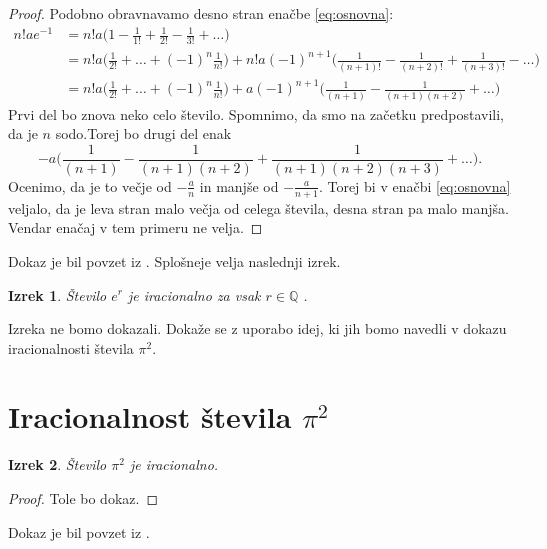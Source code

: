 \documentclass[a4paper]{article}
\theoremstyle{plain}
\newtheorem{izrek}{Izrek}
\begin{document}
\begin{proof}
Podobno obravnavamo desno stran enačbe \eqref{eq:osnovna}:
\begin{align*}
n!ae^{-1} &= n!a \bigg(1-\frac{1}{1!}+\frac{1}{2!}-\frac{1}{3!}+\dots \bigg) \\
&=n!a \bigg(\frac{1}{2!}+\dots+(-1)^n\frac{1}{n!}\bigg) + n!a (-1)^{n+1} \bigg( \frac{1}{(n+1)!}-\frac{1}{(n+2)!}+\frac{1}{(n+3)!}-\dots\bigg)\\
&=n!a \bigg(\frac{1}{2!}+\dots+(-1)^n\frac{1}{n!}\bigg) + a(-1)^{n+1} \bigg( \frac{1}{(n+1)}-\frac{1}{(n+1)(n+2)}+\dots\bigg)
\end{align*}
Prvi del bo znova neko celo število. Spomnimo, da smo na začetku predpostavili, da je $n$ sodo.Torej bo drugi del enak
\begin{equation*}
-a \bigg( \frac{1}{(n+1)}-\frac{1}{(n+1)(n+2)}+\frac{1}{(n+1)(n+2)(n+3)}+\dots\bigg).
\end{equation*}
Ocenimo, da je to večje od $-\frac{a}{n}$ in manjše od $-\frac{a}{n+1}$. Torej bi v enačbi \eqref{eq:osnovna} veljalo, da je leva stran malo večja od celega števila, desna stran pa malo manjša. Vendar enačaj v tem primeru ne velja. 
\end{proof}

Dokaz je bil povzet iz \cite{dokazi}. Splošneje velja naslednji izrek.

\begin{izrek}
Število $e^r$ je iracionalno za vsak $r\in\mathbb{Q}$ .
\end{izrek}

Izreka ne bomo dokazali. Dokaže se z uporabo idej, ki jih bomo navedli v dokazu iracionalnosti števila $\pi^2$.

\section*{Iracionalnost števila $\pi^2$}

\begin{izrek}
Število $\pi^2$ je iracionalno.
\end{izrek}
\begin{proof}
Tole bo dokaz. 
\end{proof}
Dokaz je bil povzet iz \cite{dokazi}.



\end{document}
